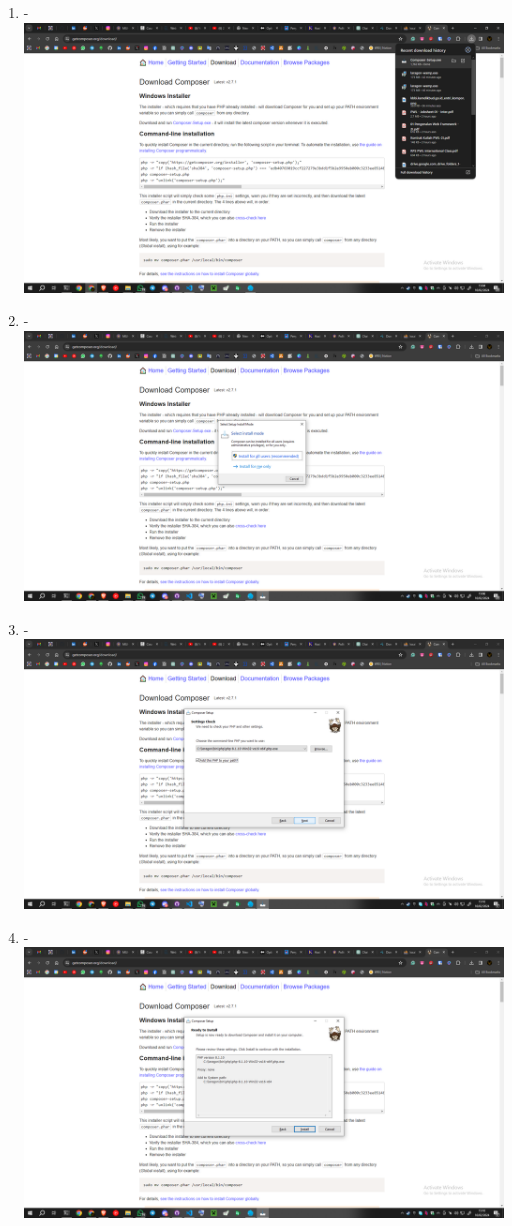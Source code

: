 \documentclass[12pt,titlepage]{article}
\begin{document}
\begin{enumerate}[label= \alph*.]
    \item - \\ \includegraphics[width=.9\textwidth]{images/figures/Composer 1.png}
    \item - \\ \includegraphics[width=.9\textwidth]{images/figures/Composer 2.png}
    \newpage
    \item - \\ \includegraphics[width=.9\textwidth]{images/figures/Composer 3.png}
    \item - \\ \includegraphics[width=.9\textwidth]{images/figures/Composer 4.png}

\end{enumerate}
\end{document}
